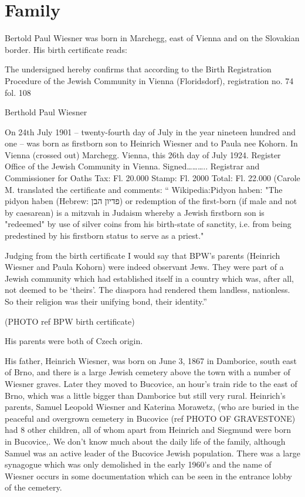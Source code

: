 \chapter{Family}

Bertold Paul Wiesner was born in Marchegg, east of Vienna and on the Slovakian border. His birth
certificate reads:

The undersigned hereby confirms that according to the Birth Registration Procedure of the Jewish
Community in Vienna (Floridsdorf), registration no. 74 fol. 108

Berthold Paul Wiesner

On 24th July 1901 – twenty-fourth day of July in the year nineteen hundred and one – was born as
firstborn son to Heinrich Wiesner and to Paula nee Kohorn.
In Vienna (crossed out) Marchegg.
Vienna, this 26th day of July 1924.
Register Office of the Jewish Community in Vienna.
Signed……….. Registrar and Commissioner for Oaths
Tax: Fl. 20.000 Stamp: Fl. 2000 Total: Fl. 22.000
(Carole M. translated the certificate and comments: “
Wikipedia:Pidyon haben: "The pidyon haben (Hebrew:
פדיון הבן) or redemption of the first-born
(if male and not by caesarean) is a mitzvah in Judaism whereby a Jewish firstborn son is
"redeemed" by use of silver coins from his birth-state of sanctity, i.e. from being predestined by his
firstborn status to serve as a priest."

Judging from the birth certificate I would say that BPW’s parents (Heinrich Wiesner and Paula
Kohorn) were indeed observant Jews. They were part of a Jewish community which had
established itself in a country which was, after all, not deemed to be ‘theirs’. The diaspora had
rendered them landless, nationless. So their religion was their unifying bond, their identity.”

(PHOTO ref BPW birth certificate)

His parents were both of Czech origin.

His father, Heinrich Wiesner, was born on June 3, 1867 in Damborice, south east of Brno, and there
is a large Jewish cemetery above the town with a number of Wiesner graves. Later they moved to
Bucovice, an hour’s train ride to the east of Brno, which was a little bigger than Damborice but still
very rural. Heinrich’s parents, Samuel Leopold Wiesner and Katerina Morawetz, (who are buried
in the peaceful and overgrown cemetery in Bucovice (ref PHOTO OF GRAVESTONE) had 8 other
children, all of whom apart from Heinrich and Siegmund were born in Bucovice,. We don’t know
much about the daily life of the family, although Samuel was an active leader of the Bucovice
Jewish population. There was a large synagogue which was only demolished in the early 1960’s and
the name of Wiesner occurs in some documentation which can be seen in the entrance lobby of the
cemetery.

